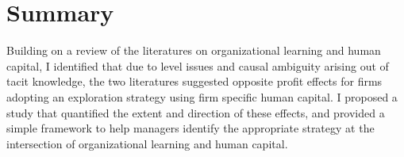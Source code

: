 \documentclass[12pt,letterpaper]{article}
\begin{document}
\section{Summary}
Building on a review of the literatures on organizational learning and human capital, I identified that due to level issues and causal ambiguity arising out of tacit knowledge, the two literatures suggested opposite profit effects for firms adopting an exploration strategy using firm specific human capital. I proposed a study that quantified the extent and direction of these effects, and provided a simple framework to help managers identify the appropriate strategy at the intersection of organizational learning and human capital.


\begin{singlespace}
\renewcommand{\refname}{REFERENCES}
 

\end{singlespace}
\end{document}
